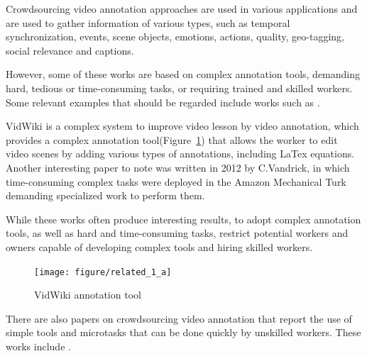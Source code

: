 Crowdsourcing video annotation approaches are used in various applications and are used to gather information of various types, such as temporal synchronization\cite{wu2014crowdsourced,wfa2016}, events\cite{Kim:2014:JSL:2679600.2680027,sulser2014crowd}, scene objects\cite{vidwiki2014,pinto2013tag4vd}, emotions\cite{sanchez2015mood,biel2013youtube}, actions\cite{riek2011guess,desell2015effectiveness}, quality\cite{freiburg2011crowdsourcing,han2014quality}, geo-tagging\cite{chen2015crowd,gottlieb2012pushing}, social relevance\cite{santos2014towards,huron2013polemictweet,bertini2013socially} and captions\cite{deshpande2014crowdsourcing,kacorri2014introducing}. 

However, some of these works are based on complex annotation tools, demanding hard, tedious or time-consuming tasks, or requiring trained and skilled workers. Some relevant examples that should be regarded include works such as \cite{vidwiki2014,Vondrick:2013:ESU:2436010.2436013,park2014toward,biel2013youtube,desell2015effectiveness,gottlieb2012pushing,huron2013polemictweet}.

VidWiki\cite{vidwiki2014} is a complex system to improve video lesson by video annotation, which provides a complex annotation tool(Figure~\ref{related_1_a}) that allows the worker to edit video scenes by adding various types of annotations, including LaTex equations. Another interesting paper to note was written in 2012 by C.Vandrick\cite{Vondrick:2013:ESU:2436010.2436013}, in which time-consuming complex tasks were deployed in the Amazon Mechanical Turk\cite{gottlieb2012pushing} demanding specialized work to perform them. 

While these works often produce interesting results, to adopt complex annotation tools, as well as hard and time-consuming tasks, restrict potential workers and owners capable of developing complex tools and hiring skilled workers.

\begin{figure}[h]
	\centerline{\texttt{[image: figure/related\_1\_a]}}
	\caption{VidWiki annotation tool\cite{vidwiki2014}}
	\label{related_1_a}
\end{figure} 

There are also papers on crowdsourcing video annotation that report the use of simple tools and microtasks that can be done quickly by unskilled workers. These works include \cite{Chen:2017:RIM:3025453.3025969,Kim:2014:JSL:2679600.2680027,riek2011guess,gadgil2014web,wfa2016,wu2014crowdsourced,pinto2013tag4vd,sulser2014crowd}.

